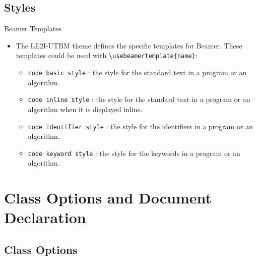 \documentclass[english,sectioncirclenumberstyle]{le2iutbmbeamer}
\begin{document}
\subsection{Styles}
\begin{frame}{Beamer Templates}
	\begin{itemize}
	\item The LE2I-UTBM theme defines the specific templates for Beamer. These templates could be used with 
		\texttt{{\textbackslash}usebeamertemplate\{name\}}:
		\begin{itemize}
		\item \texttt{code basic style} : the style for the standard text in a program or an algorithm. 
		\vfill
		\item \texttt{code inline style} : the style for the standard text in a program or an algorithm when it is displayed inline. 
		\vfill
		\item \texttt{code identifier style} : the style for the identifiers in a program or an algorithm. 
		\vfill
		\item \texttt{code keyword style} : the style for the keywords in a program or an algorithm. 
		\end{itemize}
	\end{itemize}
\end{frame}

\section{Class Options and Document Declaration}
\tableofcontentslide[sectionstyle={show/shaded},subsectionstyle={show/show/hide},subsubsectionstyle={hide/hide/hide/hide},sections={1-6}]

\subsection{Class Options}
\end{document}
